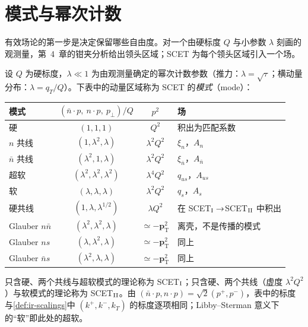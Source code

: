 \section{模式与幂次计数}\label{sec:scet-modes}

有效场论的第一步是决定保留哪些自由度。对一个由硬标度 $Q$ 与小参数 $\lambda$ 刻画的观测量，第~4~章的钳夹分析给出领头区域；SCET 为每个领头区域引入一个场。

\begin{definition}[模式]\label{def:scet-modes}
设 $Q$ 为硬标度，$\lambda\ll1$ 为由观测量确定的幂次计数参数（推力：$\lambda=\sqrt\tau$；横动量分布：$\lambda=q_T/Q$）。下表中的动量区域称为 SCET 的\emph{模式}（mode）：
\begin{center}\small
\renewcommand{\arraystretch}{1.15}
\begin{tabular}{@{}lccl@{}}
\toprule
模式 & $(\bar n\cdot p,\ n\cdot p,\ p_\perp)/Q$ & $p^2$ & 场 \\
\midrule
硬 & $(1,1,1)$ & $Q^2$ & 积出为匹配系数 \\
$n$ 共线 & $(1,\lambda^2,\lambda)$ & $\lambda^2Q^2$ & $\xi_n$，$A_n$ \\
$\bar n$ 共线 & $(\lambda^2,1,\lambda)$ & $\lambda^2Q^2$ & $\xi_{\bar n}$，$A_{\bar n}$ \\
超软 & $(\lambda^2,\lambda^2,\lambda^2)$ & $\lambda^4Q^2$ & $q_{us}$，$A_{us}$ \\
软 & $(\lambda,\lambda,\lambda)$ & $\lambda^2Q^2$ & $q_s$，$A_s$ \\
硬共线 & $(1,\lambda,\lambda^{1/2})$ & $\lambda Q^2$ & 在 SCET$_{\rm I}\to$SCET$_{\rm II}$ 中积出 \\
Glauber $n\bar n$ & $(\lambda^2,\lambda^2,\lambda)$ & $\simeq-\bm p_{\mathrm T}^2$ & 离壳，不是传播的模式 \\
Glauber $ns$ & $(\lambda,\lambda^2,\lambda)$ & $\simeq-\bm p_{\mathrm T}^2$ & 同上 \\
Glauber $\bar ns$ & $(\lambda^2,\lambda,\lambda)$ & $\simeq-\bm p_{\mathrm T}^2$ & 同上 \\
\bottomrule
\end{tabular}
\end{center}
只含硬、两个共线与超软模式的理论称为 SCET$_{\rm I}$；只含硬、两个共线（虚度 $\lambda^2Q^2$）与软模式的理论称为 SCET$_{\rm II}$。由 $(\bar n\cdot p,n\cdot p)=\sqrt2(p^+,p^-)$，表中的标度与\cref{def:ir-scalings}中 $(k^+,k^-,k_T)$ 的标度逐项相同；Libby--Sterman 意义下的“软”即此处的超软。
\end{definition}

